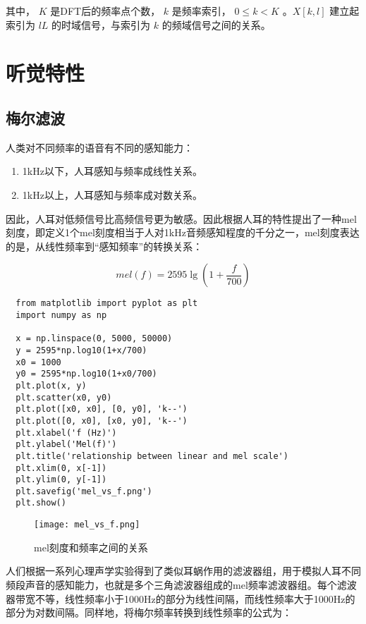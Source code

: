 \documentclass[cn,10pt,math=newtx,citestyle=gb7714-2015,bibstyle=gb7714-2015]{elegantbook}
\begin{document}
其中， $K$ 是DFT后的频率点个数， $k$ 是频率索引， $0\leq k< K$ 。$X[k,l]$ 建立起索引为 $lL$ 的时域信号，与索引为 $k$ 的频域信号之间的关系。

\section{听觉特性}

\subsection{梅尔滤波}

人类对不同频率的语音有不同的感知能力：

\begin{enumerate}
  \item 1kHz以下，人耳感知与频率成线性关系。
  \item 1kHz以上，人耳感知与频率成对数关系。
\end{enumerate}

因此，人耳对低频信号比高频信号更为敏感。因此根据人耳的特性提出了一种mel刻度，即定义1个mel刻度相当于人对1kHz音频感知程度的千分之一，mel刻度表达的是，从线性频率到“感知频率”的转换关系：

\begin{equation}
  mel(f)=2595\mathop{lg}(1+\frac{f}{700})
\end{equation}

\begin{lstlisting}
  from matplotlib import pyplot as plt
  import numpy as np

  x = np.linspace(0, 5000, 50000)
  y = 2595*np.log10(1+x/700)
  x0 = 1000
  y0 = 2595*np.log10(1+x0/700)
  plt.plot(x, y)
  plt.scatter(x0, y0)
  plt.plot([x0, x0], [0, y0], 'k--')
  plt.plot([0, x0], [x0, y0], 'k--')
  plt.xlabel('f (Hz)')
  plt.ylabel('Mel(f)')
  plt.title('relationship between linear and mel scale')
  plt.xlim(0, x[-1])
  plt.ylim(0, y[-1])
  plt.savefig('mel_vs_f.png')
  plt.show()
\end{lstlisting}

\begin{figure}[htbp]
  \centering
  \texttt{[image: mel\_vs\_f.png]}
  \caption{mel刻度和频率之间的关系 \label{fig:mel_vs_f}}
\end{figure}

人们根据一系列心理声学实验得到了类似耳蜗作用的滤波器组，用于模拟人耳不同频段声音的感知能力，也就是多个三角滤波器组成的mel频率滤波器组。每个滤波器带宽不等，线性频率小于1000Hz的部分为线性间隔，而线性频率大于1000Hz的部分为对数间隔。同样地，将梅尔频率转换到线性频率的公式为：
\end{document}
